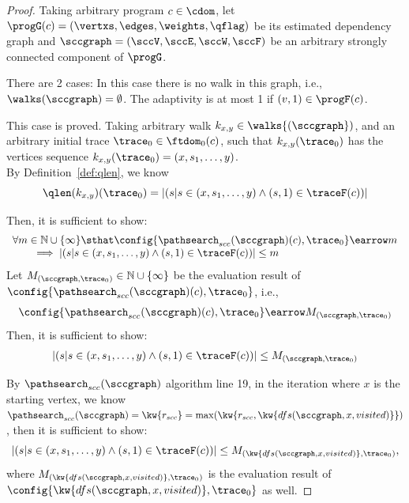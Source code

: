 \begin{proof}
  Taking arbitrary program $c \in \cdom$, let $\progG(c) = (\vertxs, \edges, \weights, \qflag)$ be its 
  estimated dependency graph and $\sccgraph = (\sccV, \sccE, \sccW, \sccF)$ be an arbitrary strongly connected component of $\progG$.

  There are 2 cases:
%
In this case there is no walk in this graph, i.e., $\walks(\sccgraph) = \emptyset$.
The adaptivity is at most 1 if $(v, 1) \in \progF(c)$.

This case is proved.
%
  Taking arbitrary walk $k_{x,y} \in \walks{(\sccgraph})$, and an arbitrary initial trace $\trace_0 \in \ftdom_0(c)$, such that $k_{x,y}(\trace_0)$ has the vertices sequence
  $k_{x,y}(\trace_0) = (x, s_1, \ldots, y)$.
  \\
  By Definition~\ref{def:qlen}, we know
  \[
    \qlen(k_{x,y})(\trace_0) = |(s | s \in (x, s_1, \ldots, y) \land (s, 1)\in \traceF(c))|
  \]
  
 Then, it is sufficient to show:
  \[
    \begin{array}{l}
      \forall m \in \mathbb{N} \cup \{\infty\} \sthat
      \config{\pathsearch_{scc}(\sccgraph)(c), \trace_0} \earrow m
      \\ \qquad   
      \implies
      |(s | s \in (x, s_1, \ldots, y) \land (s, 1)\in \traceF(c))| \leq m
    \end{array}
\]
Let $M_{(\sccgraph, \trace_0)}\in \mathbb{N} \cup \{\infty\} $ be the evaluation result of $\config{\pathsearch_{scc}(\sccgraph)(c), \trace_0}$, i.e.,
\[
  \config{\pathsearch_{scc}(\sccgraph)(c), \trace_0} \earrow
  M_{(\sccgraph, \trace_0)}
  \]
  Then, it is sufficient to show:
  \[
    \begin{array}{l}
      |(s | s \in (x, s_1, \ldots, y) \land (s, 1)\in \traceF(c))| \leq 
      M_{(\sccgraph, \trace_0)}
    \end{array}
\]

  By $\pathsearch_{scc}(\sccgraph)$ algorithm line 19, in the iteration where $x$ is the starting vertex,
  we know $\pathsearch_{scc}(\sccgraph) = \kw{r_{scc}} = \max(\kw{r_{scc}, \kw{dfs(\sccgraph, x, visited)}})$,
  then it is sufficient to show:
  $$
  |(s | s \in (x, s_1, \ldots, y) \land (s, 1)\in \traceF(c))| \leq M_{(\kw{dfs(\sccgraph, x, visited)}, \trace_0)},
  $$
  where $M_{(\kw{dfs(\sccgraph, x, visited)}, \trace_0)}$ is the evaluation result of $\config{\kw{dfs(\sccgraph, x, visited)}, \trace_0}$ as well.


\end{proof}
